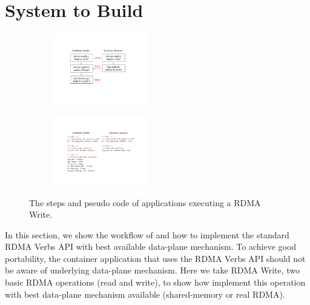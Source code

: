\section{System to Build} \label{sec:promise}

     \begin{figure}[th]
     \centering 
     \begin{subfigure}
     \centering 
     \includegraphics[width=0.45\textwidth]{figures/system/sys_rdma_steps.pdf}
     \end{subfigure}
           
     \begin{subfigure}
     \centering 
     \includegraphics[width=0.45\textwidth]{figures/system/sys_rdma_code.pdf}      
     \end{subfigure}
     \label{fig:sys_rdma_steps_code}
     \caption{The steps and pseudo code of applications executing a RDMA Write.} 
     \end{figure}

In this section, we show the workflow of \sysname and how to 
implement the standard RDMA Verbs API with best available data-plane mechanism.
To achieve good portability, the container application that uses the RDMA Verbs API should not be aware of
underlying data-plane mechanism. 
Here we take RDMA Write, two basic RDMA operations (read and write), 
to show how \sysname implement this operation with best data-plane mechanism available (shared-memory or real RDMA).

